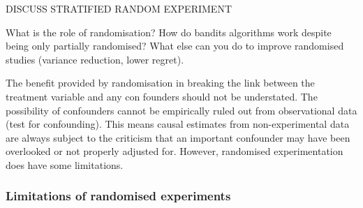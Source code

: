\documentclass[11pt,a4paper,oneside]{book}
\theoremstyle{plain}
\theoremstyle{definition}
\begin{document}
DISCUSS STRATIFIED RANDOM EXPERIMENT

What is the role of randomisation? How do bandits algorithms work despite being only partially randomised? What else can you do to improve randomised studies (variance reduction, lower regret).

The benefit provided by randomisation in breaking the link between the treatment variable and any con founders should not be understated. The possibility of confounders cannot be empirically ruled out from observational data \citep{Pearl2000} (test for confounding). This means causal estimates from non-experimental data are always subject to the criticism that an important confounder may have been overlooked or not properly adjusted for. However, randomised experimentation does have some limitations. 

\subsubsection{Limitations of randomised experiments}
\label{subsec:limitations_of_experiment}
\end{document}

